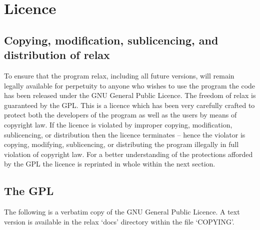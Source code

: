 
\chapter{Licence}



\section{Copying, modification, sublicencing, and distribution of relax}

To ensure that the program relax, including all future versions, will remain legally available for perpetuity to anyone who wishes to use the program the code has been released under the GNU General Public Licence.  The freedom of relax is guaranteed by the GPL.  This is a licence which has been very carefully crafted to protect both the developers of the program as well as the users by means of copyright law.  If the licence is violated by improper copying, modification, sublicencing, or distribution then the licence terminates -- hence the violator is copying, modifying, sublicencing, or distributing the program illegally in full violation of copyright law.  For a better understanding of the protections afforded by the GPL the licence is reprinted in whole within the next section.




\section{The GPL}

The following is a verbatim copy of the GNU General Public Licence.  A text version is available in the relax `docs' directory within the file `COPYING'.


\newpage


